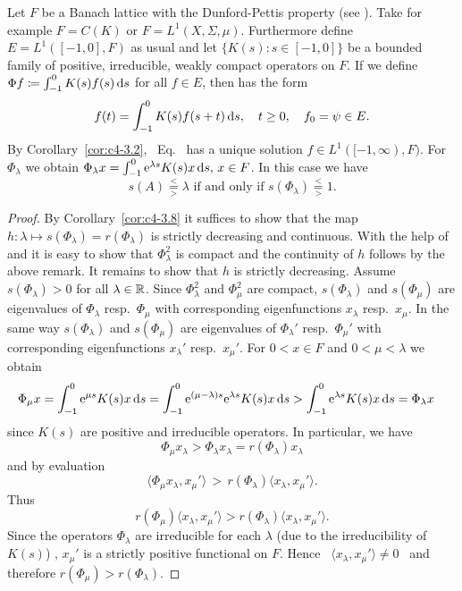 \begin{example}\label{ex:c4-3.10}
%
Let $F$ be a Banach lattice with the Dunford-Pettis property (see \textcite[Section II.9]{schaefer:1974}).
Take for example $F = C(K)$ or $F = L^{1}(X, \Sigma, \mu)$.
Furthermore define $E = L^{1}([-1,0],F)$ as usual and let $\{K(s) \colon s \in [-1,0]\}$ be a bounded family of positive, irreducible, weakly compact operators on $F$.
If we define $\Phi f \coloneq \int_{-1}^{0} K(s)f(s) \mathop{}\!\mathrm{d}{s}$ for all $f \in E$, then 
has the form
\begin{equation}\label{eq:c4-3.11}
f(t) = \int_{-1}^{0} K(s)f(s+t) \ds  , \quad t \geq 0  ,\quad f_{0} = \psi \in E .
\end{equation}
By Corollary~\ref{cor:c4-3.2}, \ Eq.~ has a unique solution $f \in L^{1}([-1,\infty),F)$.
For $\Phi_{\lambda}$ we obtain $\Phi_{\lambda}x = \int_{-1}^{0} \mathrm{e}^{\lambda s}K(s)x \mathop{}\!\mathrm{d}{s},\, x \in F$.
In this case we have 
\[
\text{$s(A) \overset{<}{ \underset{>}{=} } \lambda$  if and only if 
$s(\Phi_{\lambda}) \overset{<}{ \underset{>}{=} } 1$.}
\]
\end{example}
\begin{proof}
By Corollary~\ref{cor:c4-3.8} it suffices to show that the map $h \colon \lambda \mapsto s(\Phi_{\lambda}) = r(\Phi_{\lambda})$ is strictly decreasing and continuous.
With the help of \textcite[Theorem III.11.4]{schaefer:1966} and \textcite[Theorem II.9.9]{schaefer:1974} it is easy to show that $\Phi_{\lambda}^{2}$ is compact and the continuity of\/ $h$ follows by the above remark.
It remains to show that $h$ is strictly decreasing.
Assume $s(\Phi_{\lambda}) > 0$ for all $\lambda \in \mathbb{R}$.
Since $\Phi_{\lambda}^{2}$ and $\Phi_{\mu}^{2}$ are compact, 
$s(\Phi_{\lambda})$ and $s(\Phi_{\mu})$ are eigenvalues of\/ $\Phi_{\lambda}$ resp.\ $\Phi_{\mu}$ with corresponding eigenfunctions $x_{\lambda}$ resp.\ $x_{\mu}$.
In the same way $s(\Phi_{\lambda})$ and $s(\Phi_{\mu})$ are eigenvalues of\/ $\Phi_{\lambda}'$ resp.\ $\Phi_{\mu}'$ with corresponding eigenfunctions $x_{\lambda}'$ resp.\ $x_{\mu}'$.
For $0 < x \in F$ and $0 < \mu < \lambda$ we obtain
\begin{align*}
\Phi_{\mu}x &= \int_{-1}^{0} \mathrm{e}^{\mu s}K(s)x \mathop{}\!\mathrm{d}{s} = \int_{-1}^{0} \mathrm{e}^{(\mu-\lambda) s}\mathrm{e}^{\lambda s}K(s)x \mathop{}\!\mathrm{d}{s} > \int_{-1}^{0} \mathrm{e}^{\lambda s}K(s)x \mathop{}\!\mathrm{d}{s} = \Phi_{\lambda}x
\end{align*}
since $K(s)$ are positive and irreducible operators.
In particular, we have 
%
\[
	\Phi_{\mu}x_{\lambda} > \Phi_{\lambda}x_{\lambda} = r(\Phi_{\lambda})x_{\lambda}
\]
%
and by evaluation %
\[
	\langle\Phi_{\mu}x_{\lambda},x_{\mu}'\rangle \,>\, r(\Phi_{\lambda})\langle x_{\lambda},x_{\mu}'\rangle .
\]
%
Thus %
\[
	r(\Phi_{\mu})\langle x_{\lambda},x_{\mu}'\rangle > r(\Phi_{\lambda})\langle x_{\lambda},x_{\mu}'\rangle .
\]
%
Since the operators $\Phi_{\lambda}$ are irreducible for each $\lambda$ (due to the irreducibility of\/ $K(s)$) , $x_{\mu}'$ is a strictly positive functional on $F$.
Hence \ $\langle x_{\lambda},x_{\mu}'\rangle \neq 0$ \ and therefore
$r(\Phi_{\mu}) > r(\Phi_{\lambda})$.
\end{proof}

